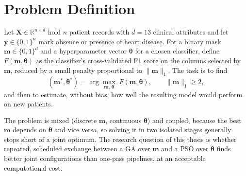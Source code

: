 \documentclass[MTech]{ugthesis}
\begin{document}
\section{Problem Definition}
\label{sec:problem}
Let $\mathbf{X}\in\mathbb{R}^{n\times d}$ hold $n$ patient records with $d=13$ clinical attributes and let $\mathbf{y}\in\{0,1\}^n$ mark absence or presence of heart disease. For a binary mask $\mathbf{m}\in\{0,1\}^d$ and a hyperparameter vector $\boldsymbol{\theta}$ for a chosen classifier, define $F(\mathbf{m},\boldsymbol{\theta})$ as the classifier's cross-validated F1 score on the columns selected by $\mathbf{m}$, reduced by a small penalty proportional to $\|\mathbf{m}\|_1$. The task is to find
\begin{equation}
(\mathbf{m}^{*},\boldsymbol{\theta}^{*}) = \arg\max_{\mathbf{m},\,\boldsymbol{\theta}} \; F(\mathbf{m},\boldsymbol{\theta}),
\qquad \|\mathbf{m}\|_1 \ge 2,
\label{eq:problem}
\end{equation}
and then to estimate, without bias, how well the resulting model would perform on new patients.

The problem is mixed (discrete $\mathbf{m}$, continuous $\boldsymbol{\theta}$) and coupled, because the best $\mathbf{m}$ depends on $\boldsymbol{\theta}$ and vice versa, so solving it in two isolated stages generally stops short of a joint optimum. The research question of this thesis is whether repeated, scheduled exchange between a GA over $\mathbf{m}$ and a PSO over $\boldsymbol{\theta}$ finds better joint configurations than one-pass pipelines, at an acceptable computational cost.
\end{document}
